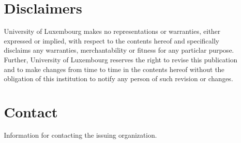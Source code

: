 \section{Disclaimers}
University of Luxembourg makes no representations or warranties, either
expressed or implied, with respect to the contents hereof and specifically
disclaims any warranties, merchantability or fitness for any particlar purpose.
Further, University of Luxembourg reserves the right to revise this publication
and to make changes from time to time in the contents hereof without the
obligation of this institution to notify any person of such revision or changes.

\section{Contact}
Information for contacting the issuing organization.

